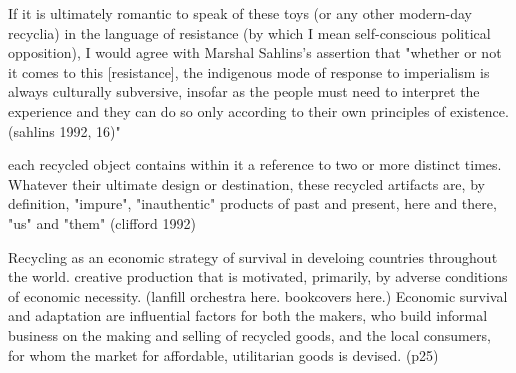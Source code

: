  If it is ultimately romantic to speak of these toys (or any other modern-day recyclia) in the language of resistance (by which I mean self-conscious political opposition), I would agree with Marshal Sahlins's assertion that "whether or not it comes to this [resistance], the indigenous mode of response to imperialism is always culturally subversive, insofar as the people must need to interpret the experience and they can do so only according to their own principles of existence. (sahlins 1992, 16)"

 each recycled object contains within it a reference to two or more distinct times.  Whatever their ultimate design or destination, these recycled artifacts are, by definition, "impure", "inauthentic" products of past and present, here and there, "us" and "them" (clifford 1992) 

 Recycling as an economic strategy of survival in develoing countries throughout the world. creative production that is motivated, primarily, by adverse conditions of economic necessity. (lanfill orchestra here. bookcovers here.) Economic survival and adaptation are influential factors for both the makers, who build informal business on the making and selling of recycled goods, and the local consumers, for whom the market for affordable, utilitarian goods is devised. (p25)

